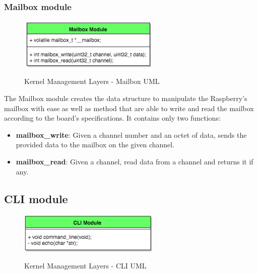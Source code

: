 \subsubsection{Mailbox module}


\begin{figure}[H]
\begin{center}
\includegraphics[width=0.6\textwidth]{includes/figures/chapter5_kernel_management_layer_mailbox_UML.png}  \\
\caption{Kernel Management Layers - Mailbox UML}
\end{center}
\label{fig:chapter5_kernel_management_layer_mailbox_UML}
\end{figure}

The Mailbox module creates the data structure to manipulate the Raspberry's mailbox with ease as well as method that are able to write and read the mailbox according to the board's specifications. It contains only two functions:
\begin{itemize}
	\item \textbf{mailbox\_write}: Given a channel number and an octet of data, sends the provided data to the mailbox on the given channel. 
	\item \textbf{mailbox\_read}: Given a channel, read data from a channel and returns it if any.
\end{itemize}


\subsection{CLI module}
\begin{figure}[H]
\begin{center}
\includegraphics[width=0.6\textwidth]{includes/figures/chapter5_kernel_management_layer_cli_UML.png}  \\
\caption{Kernel Management Layers - CLI UML}
\end{center}
\label{fig:chapter5_kernel_management_layer_mailbox_UML}
\end{figure}


